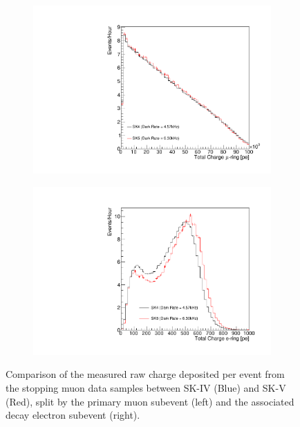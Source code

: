 \begin{figure}[h]
  \begin{subfigure}[t]{0.48\textwidth}
    \includegraphics[width=\textwidth, trim={0mm 0mm 0mm 0mm}, clip, page=1]{Figures/Simulations/ChargeAssociatedWithMuon.pdf}
  \end{subfigure}%
  \begin{subfigure}[t]{0.48\textwidth}
    \includegraphics[width=\textwidth, trim={0mm 0mm 0mm 0mm}, clip, page=1]{Figures/Simulations/ChargeAssociatedWithDecayE.pdf}
  \end{subfigure}  
  \caption{Comparison of the measured raw charge deposited per event from the stopping muon data samples between SK-IV (Blue) and SK-V (Red), split by the primary muon subevent (left) and the associated decay electron subevent (right).}
  \label{fig:Simulations_MeasuredChargeDistribution}
\end{figure}

